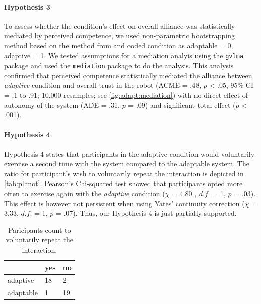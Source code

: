 \documentclass[twocolumn]{svjour3}          %
\begin{document}
\paragraph{Hypothesis 3}
To assess whether the condition's effect on overall alliance was
statistically mediated by perceived competence, we used non-parametric
bootstrapping method based on the method from
\autocite{preacher2008asymptotic} and coded condition as adaptable =
0, adaptive = 1. We tested assumptions for a mediation analyis using
the \texttt{gvlma} package and used the \texttt{mediation} package to do
the analysis. This analysis confirmed that perceived competence
statistically mediated the alliance between \textit{adaptive} condition and
overall trust in the robot (ACME = .48, \(p\) \textless{} .05, 95\% CI =
.1 to .91; 10,000 resamples; see \autoref{fig:adapt:mediation}) with no
direct effect of autonomy of the system (ADE = .31, \(p\) = .09) and
significant total effect (\(p\) \textless{} .001).


\hypertarget{motivation-to-interaction}{%
\paragraph{Hypothesis 4}\label{motivation-to-interaction}}
Hypothesis 4 states that participants in the adaptive condition would voluntarily exercise a second time with the system compared to the adaptable system. 
The ratio for participant's wish to voluntarily repeat the interaction
is depicted in \autoref{tab:pl:mot}. Pearson's Chi-squared test
showed that participants opted more often to exercise again with the
\textit{adaptive} condition (\(\chi\) = 4.80 , \(d.f.\) = 1, \(p\) = .03). This
effect is however not persistent when using Yates' continuity correction
(\(\chi\) = 3.33, \(d.f.\) = 1, \(p\) = .07). Thus, our Hypothesis 4 is just partially supported.

\begin{center}
\begin{table} [ht!]
\centering
\captionsetup{justification=centering}
\caption{Paricipants count to voluntarily repeat the interaction.}\label{tab:pl:mot}
\begin{tabular}{@{} *3l @{}}    \toprule
  & yes &  no \\ \midrule
  adaptive & 18    & 2 \\
 adaptable & 1  & 19 \\\bottomrule
\end{tabular}
\end{table}
\end{center}
\end{document}
